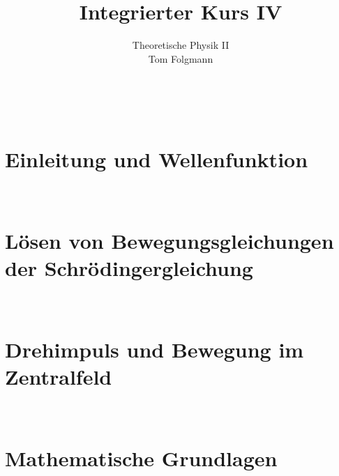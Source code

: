 \documentclass{article}
\title{Integrierter Kurs IV}
\author{Theoretische Physik II\\Tom Folgmann}
\begin{document}
    \maketitle
    \noindent{}
    \tableofcontents
    \thispagestyle{empty}
    \newpage
    \ 
    \thispagestyle{empty}
    \newpage

    \section{Einleitung und Wellenfunktion}
        
        
        
        
        
        
        
        

    \clearpage
    \thispagestyle{empty}
    \newpage
    \ 
    \thispagestyle{empty}
    \newpage
    \section{Lösen von Bewegungsgleichungen der Schrödingergleichung}
        
        
        
        

    \clearpage
    \thispagestyle{empty}
    \newpage
    \ 
    \thispagestyle{empty}
    \newpage
    \section{Drehimpuls und Bewegung im Zentralfeld}
        

        
        

    \clearpage
    \thispagestyle{empty}
    \newpage
    \ 
    \thispagestyle{empty}
    \newpage
    \section{Mathematische Grundlagen}
        
        
        
        
        
        
        
        
    \clearpage
    \thispagestyle{empty}
    \newpage
    \ 
    \thispagestyle{empty}
    \newpage
\end{document}
